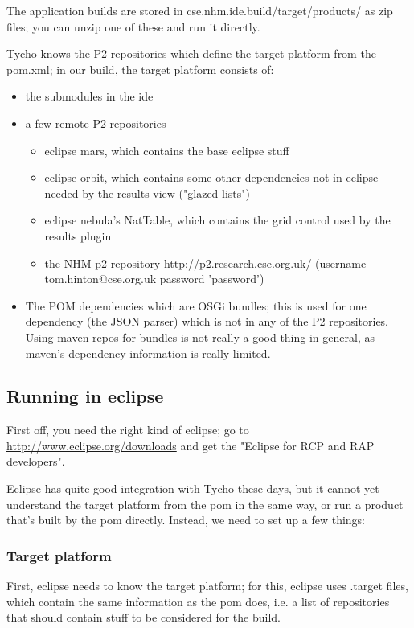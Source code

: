 \documentclass[11pt]{article}
\begin{document}
The application builds are stored in cse.nhm.ide.build/target/products/ as zip files; you can unzip one of these and run it directly.

Tycho knows the P2 repositories which define the target platform from the pom.xml; in our build, the target platform consists of:

\begin{itemize}
\item the submodules in the ide
\item a few remote P2 repositories
\begin{itemize}
\item eclipse mars, which contains the base eclipse stuff
\item eclipse orbit, which contains some other dependencies not in eclipse needed by the results view ("glazed lists")
\item eclipse nebula's NatTable, which contains the grid control used by the results plugin
\item the NHM p2 repository \url{http://p2.research.cse.org.uk/} (username tom.hinton@cse.org.uk password 'password')
\end{itemize}
\item The POM dependencies which are OSGi bundles; this is used for one dependency (the JSON parser) which is not in any of the P2 repositories. Using maven repos for bundles is not really a good thing in general, as maven's dependency information is really limited.
\end{itemize}
\subsection{Running in eclipse}
\label{sec-2-2}
First off, you need the right kind of eclipse; go to \url{http://www.eclipse.org/downloads} and get the "Eclipse for RCP and RAP developers".

Eclipse has quite good integration with Tycho these days, but it cannot yet understand the target platform from the pom in the same way, or run a product that's built by the pom directly. Instead, we need to set up a few things:
\subsubsection{Target platform}
\label{sec-2-2-1}
First, eclipse needs to know the target platform; for this, eclipse uses .target files, which contain the same information as the pom does, i.e. a list of repositories that should contain stuff to be considered for the build.
\end{document}
